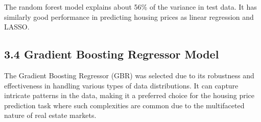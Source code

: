 \documentclass[12pt, letterpaper]{report}
\begin{document}
The random forest model explains about 56\% of the variance in test data. It has similarly good performance in predicting housing prices as linear regression and LASSO. 


\subsection*{3.4 Gradient Boosting Regressor Model}

The Gradient Boosting Regressor (GBR) was selected due to its robustness and effectiveness in handling various types of data distributions. It can capture intricate patterns in the data, making it a preferred choice for the housing price prediction task where such complexities are common due to the multifaceted nature of real estate markets.
\begin{table}[h]
  \centering
  \caption{GBR performance}
\end{table}


\end{document}
